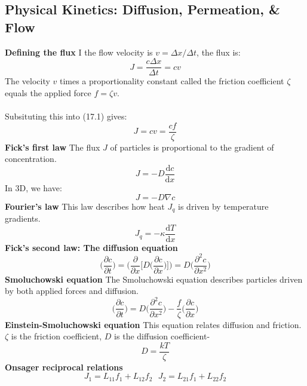 \documentclass[8pt]{article}
\numberwithin{equation}{section}
\begin{document}
\begin{multicols}{2}
\section{Physical Kinetics: Diffusion, Permeation, \& Flow}
\textbf{Defining the flux}
I the flow velocity is $v=\Delta x/\Delta t$, the flux is:
\begin{equation}
J=\frac{c\Delta x}{\Delta t}=cv \tag{17.1}
\end{equation}
The velocity $v$ times a proportionality constant called the friction coefficient $\zeta$ equals the applied force $f=\zeta v$. \\\\
Subsituting this into (17.1) gives: 
\begin{equation}
J=cv=\frac{cf}{\zeta} \tag{17.4}
\end{equation}
\textbf{Fick's first law}
The flux $J$ of particles is proportional to the gradient of concentration. 
\begin{equation}
J=-D\frac{\mathrm{d}c}{\mathrm{d}x} \tag{17.5}
\end{equation}
In 3D, we have: 
\begin{equation}
J=-D\nabla c \tag{17.6}
\end{equation}
\textbf{Fourier's law}
This law describes how heat $J_{q}$ is driven by temperature gradients. 
\begin{equation}
J_{q}=-\kappa \frac{\mathrm{d}T}{\mathrm{d}x} \tag{17.7}
\end{equation}
\textbf{Fick's second law: The diffusion equation}
\begin{equation}
\bigg( \frac{\partial c}{\partial t}\bigg)=\bigg( \frac{\partial}{\partial x}\bigg[D\bigg(\frac{\partial c}{\partial x}\bigg)\bigg]\bigg)=D\bigg(\frac{\partial^{2}c}{\partial x^{2}}\bigg) \tag{17.12}
\end{equation}
\textbf{Smoluchowski equation}
The Smoluchowski equation describes particles driven by both applied forces and diffusion. 
\begin{equation}
\bigg(\frac{\partial c}{\partial t}\bigg)=D\bigg(\frac{\partial^{2}c}{\partial x^{2}}\bigg)-\frac{f}{\zeta}\bigg(\frac{\partial c}{\partial x}\bigg) \tag{17.36}
\end{equation}
\textbf{Einstein-Smoluchowski equation}
This equation relates diffusion and friction. $\zeta$ is the friction coefficient, $D$ is the diffusion coefficient-
\begin{equation}
D=\frac{kT}{\zeta} \tag{17.42}
\end{equation}
\textbf{Onsager reciprocal relations}
\begin{equation}
J_{1}=L_{11}f_{1}+L_{12}f_{2} \ \ \ J_{2}=L_{21}f_{1}+L_{22}f_{2} \tag{17.72}
\end{equation}


\end{multicols}
\end{document}

